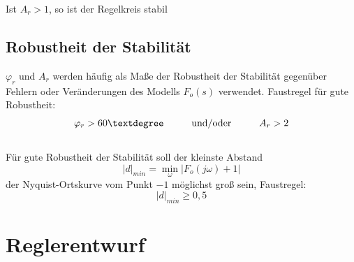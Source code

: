 \documentclass[10pt,a4paper]{article}
\newcommand{\tab}[1][1]{\hspace*{#1cm}}
\begin{document}
Ist $A_r > 1$, so ist der Regelkreis stabil

\subsection{Robustheit der Stabilität}
$\varphi_r$ und $A_r$ werden häufig als Maße der Robustheit der Stabilität gegenüber Fehlern oder Veränderungen des Modells $F_o(s)$ verwendet. Faustregel für gute Robustheit:
$$
	\varphi_r > 60° \tab \text{und/oder} \tab A_r > 2
$$ \\

Für gute Robustheit der Stabilität soll der kleinste Abstand
$$
	|d|_{min} = \min_{\omega}|F_o(j \omega) + 1|
$$
der Nyquist-Ortskurve vom Punkt $-1$ möglichst groß sein, Faustregel: 
$$
	|d|_{min} ≥ 0,5
$$

\section{Reglerentwurf}
\end{document}
